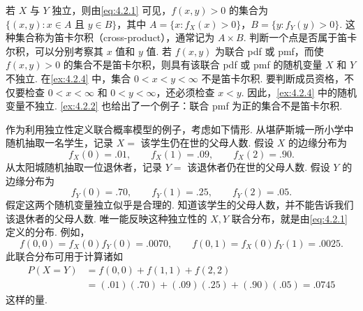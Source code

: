 若 $X$ 与 $Y$ 独立，则由\eqref{eq:4.2.1} 可见，$f(x,y)>0$ 的集合为 $\{(x,y):x\in A\text{ 且 }y\in B\}$，其中 $A=\{x:f_X(x)>0\}$，$B=\{y:f_Y(y)>0\}$. 这种集合称为笛卡尔积（cross-product），通常记为 $A\times B$. 判断一个点是否属于笛卡尔积，可以分别考察其 $x$ 值和 $y$ 值. 若 $f(x,y)$ 为联合 pdf 或 pmf，而使 $f(x,y)>0$ 的集合不是笛卡尔积，则具有该联合 pdf 或 pmf 的随机变量 $X$ 和 $Y$ 不独立. 在\autoref{ex:4.2.4} 中，集合 $0<x<y<\infty$ 不是笛卡尔积. 要判断成员资格，不仅要检查 $0<x<\infty$ 和 $0<y<\infty$，还必须检查 $x<y$. 因此，\autoref{ex:4.2.4} 中的随机变量不独立. \autoref{ex:4.2.2} 也给出了一个例子：联合 pmf 为正的集合不是笛卡尔积.
\begin{example}[联合概率模型]\label{ex:4.2.9}
作为利用独立性定义联合概率模型的例子，考虑如下情形. 从堪萨斯城一所小学中随机抽取一名学生，记录 $X=$ 该学生仍在世的父母人数. 假设 $X$ 的边缘分布为
$$f_X(0)=.01,\qquad f_X(1)=.09,\qquad f_X(2)=.90.$$
从太阳城随机抽取一位退休者，记录 $Y=$ 该退休者仍在世的父母人数. 假设 $Y$ 的边缘分布为
$$f_Y(0)=.70,\qquad f_Y(1)=.25,\qquad f_Y(2)=.05.$$
假定这两个随机变量独立似乎是合理的. 知道该学生的父母人数，并不能告诉我们该退休者的父母人数. 唯一能反映这种独立性的 $X,Y$ 联合分布，就是由\eqref{eq:4.2.1} 定义的分布. 例如，
$$f(0,0)=f_X(0)f_Y(0)=.0070,\qquad f(0,1)=f_X(0)f_Y(1)=.0025.$$
此联合分布可用于计算诸如
$$
\begin{aligned}
P(X=Y)&=f(0,0)+f(1,1)+f(2,2)\\
&=(.01)(.70)+(.09)(.25)+(.90)(.05)=.0745
\end{aligned}
$$
这样的量.
\end{example}

